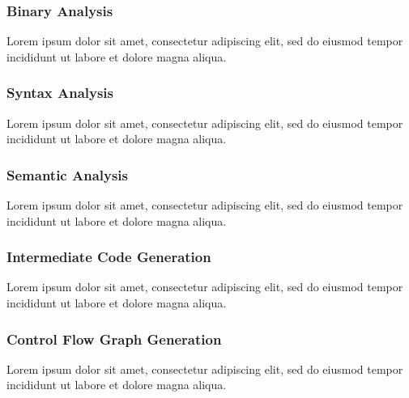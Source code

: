 \documentclass[12pt, a4paper]{article}
\begin{document}

\subsubsection{Binary Analysis}

Lorem ipsum dolor sit amet, consectetur adipiscing elit, sed do eiusmod tempor incididunt ut labore et dolore magna aliqua.


\subsubsection{Syntax Analysis}

Lorem ipsum dolor sit amet, consectetur adipiscing elit, sed do eiusmod tempor incididunt ut labore et dolore magna aliqua.


\subsubsection{Semantic Analysis}

Lorem ipsum dolor sit amet, consectetur adipiscing elit, sed do eiusmod tempor incididunt ut labore et dolore magna aliqua.


\subsubsection{Intermediate Code Generation}

Lorem ipsum dolor sit amet, consectetur adipiscing elit, sed do eiusmod tempor incididunt ut labore et dolore magna aliqua.


\subsubsection{Control Flow Graph Generation}

Lorem ipsum dolor sit amet, consectetur adipiscing elit, sed do eiusmod tempor incididunt ut labore et dolore magna aliqua.
\end{document}
